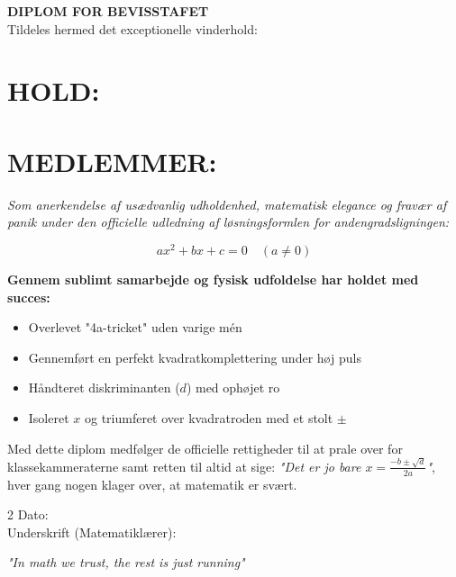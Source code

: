 \documentclass[a4paper,12pt,notitlepage]{article}
\date{}
\title{}
\begin{document}
\begin{tcolorbox}[colframe=black, colback=white, arc=3mm, outer arc=3mm, boxrule=1.5pt]
\begin{center}
{\Huge \bfseries DIPLOM FOR BEVISSTAFET} \\[0.5cm]
{\large Tildeles hermed det exceptionelle vinderhold:} \\[0.8cm]
\end{center}
\section*{HOLD:}
\label{sec:orgbedef35}

\section*{MEDLEMMER:}
\label{sec:orgcbd41ea}

\vspace{0.5cm}
\begin{center}
{\itshape Som anerkendelse af usædvanlig udholdenhed, matematisk elegance og fravær af panik under den officielle udledning af løsningsformlen for andengradsligningen:}
\end{center}

$$\quad ax^2 + bx + c = 0 \quad (a \neq 0) \quad$$

\begin{center}
{\bfseries Gennem sublimt samarbejde og fysisk udfoldelse har holdet med succes:}
\end{center}

\begin{itemize}
\item[{$\boxtimes$}] Overlevet "4a-tricket" uden varige mén
\item[{$\boxtimes$}] Gennemført en perfekt kvadratkomplettering under høj puls
\item[{$\boxtimes$}] Håndteret diskriminanten (\(d\)) med ophøjet ro
\item[{$\boxtimes$}] Isoleret \(x\) og triumferet over kvadratroden med et stolt \(\pm\)
\end{itemize}

\vspace{0.5cm}
Med dette diplom medfølger de officielle rettigheder til at prale over for klassekammeraterne samt retten til altid at sige: \textit{"Det er jo bare $x = \frac{-b \pm \sqrt{d}}{2a}$"}, hver gang nogen klager over, at matematik er svært.

\vspace{1.2cm}

\begin{multicols}{2}
\noindent Dato: \underline{\hspace{3cm}} \\[1cm]
\columnbreak
\noindent Underskrift (Matematiklærer): \\[1cm]
\underline{\hspace{5.5cm}}
\end{multicols}

\vspace{0.5cm}
\begin{center}
{\small \itshape "In math we trust, the rest is just running"}
\end{center}
\end{tcolorbox}
\end{document}
